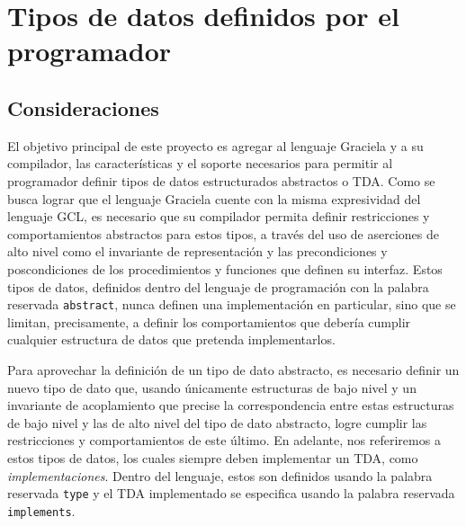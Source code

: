 \section{Tipos de datos definidos por el programador}



\subsection{Consideraciones}

El objetivo principal de este proyecto es agregar al lenguaje Graciela y a su
compilador, las características y el soporte necesarios para permitir al
programador definir tipos de datos estructurados abstractos o TDA. Como se busca
lograr que el lenguaje Graciela cuente con la misma expresividad del lenguaje
GCL, es necesario que su compilador permita definir restricciones y
comportamientos abstractos para estos tipos, a través del uso de aserciones de
alto nivel como el invariante de representación y las precondiciones y
poscondiciones de los procedimientos y funciones que definen su interfaz.
Estos tipos de datos, definidos dentro del lenguaje de programación con la
palabra reservada \texttt{abstract}, nunca definen una implementación en
particular, sino que se limitan, precisamente, a definir los comportamientos que
debería cumplir cualquier estructura de datos que pretenda implementarlos.

Para aprovechar la definición de un tipo de dato abstracto, es necesario definir
un nuevo tipo de dato que, usando únicamente estructuras de bajo nivel y un
invariante de acoplamiento que precise la correspondencia entre estas
estructuras de bajo nivel y las de alto nivel del tipo de dato abstracto, logre
cumplir las restricciones y comportamientos de este último. En adelante, nos
referiremos a estos tipos de datos, los cuales siempre deben implementar un TDA,
como \textit{implementaciones}. Dentro del lenguaje, estos son definidos usando
la palabra reservada \texttt{type} y el TDA implementado se especifica usando la
palabra reservada \texttt{implements}.


